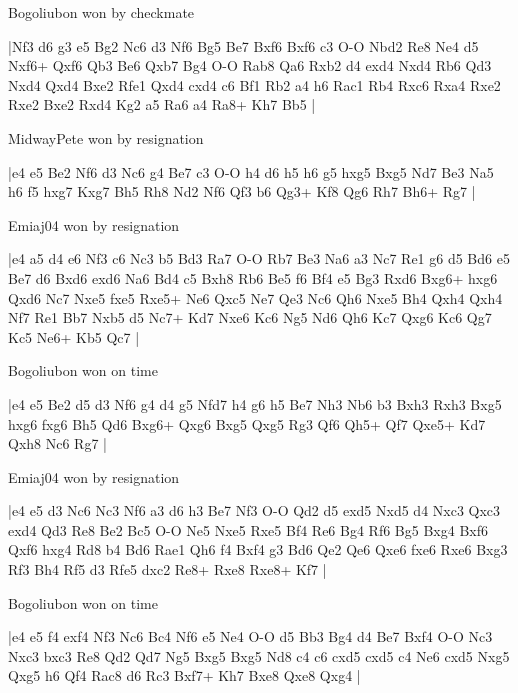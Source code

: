 \showboard

Bogoliubon won by checkmate

\makegametitle
|Nf3 d6 g3 e5 Bg2 Nc6 d3 Nf6 Bg5 Be7 Bxf6 Bxf6 c3 O-O Nbd2 Re8 Ne4 d5 Nxf6+ Qxf6 Qb3 Be6 Qxb7 Bg4 O-O Rab8 Qa6 Rxb2 d4 exd4 Nxd4 Rb6 Qd3 Nxd4 Qxd4 Bxe2 Rfe1 Qxd4 cxd4 c6 Bf1 Rb2 a4 h6 Rac1 Rb4 Rxc6 Rxa4 Rxe2 Rxe2 Bxe2 Rxd4 Kg2 a5 Ra6 a4 Ra8+ Kh7 Bb5  |

\showboard

MidwayPete won by resignation

\makegametitle
|e4 e5 Be2 Nf6 d3 Nc6 g4 Be7 c3 O-O h4 d6 h5 h6 g5 hxg5 Bxg5 Nd7 Be3 Na5 h6 f5 hxg7 Kxg7 Bh5 Rh8 Nd2 Nf6 Qf3 b6 Qg3+ Kf8 Qg6 Rh7 Bh6+ Rg7  |

\showboard

Emiaj04 won by resignation

\makegametitle
|e4 a5 d4 e6 Nf3 c6 Nc3 b5 Bd3 Ra7 O-O Rb7 Be3 Na6 a3 Nc7 Re1 g6 d5 Bd6 e5 Be7 d6 Bxd6 exd6 Na6 Bd4 c5 Bxh8 Rb6 Be5 f6 Bf4 e5 Bg3 Rxd6 Bxg6+ hxg6 Qxd6 Nc7 Nxe5 fxe5 Rxe5+ Ne6 Qxc5 Ne7 Qe3 Nc6 Qh6 Nxe5 Bh4 Qxh4 Qxh4 Nf7 Re1 Bb7 Nxb5 d5 Nc7+ Kd7 Nxe6 Kc6 Ng5 Nd6 Qh6 Kc7 Qxg6 Kc6 Qg7 Kc5 Ne6+ Kb5 Qc7  |

\showboard

Bogoliubon won on time

\makegametitle
|e4 e5 Be2 d5 d3 Nf6 g4 d4 g5 Nfd7 h4 g6 h5 Be7 Nh3 Nb6 b3 Bxh3 Rxh3 Bxg5 hxg6 fxg6 Bh5 Qd6 Bxg6+ Qxg6 Bxg5 Qxg5 Rg3 Qf6 Qh5+ Qf7 Qxe5+ Kd7 Qxh8 Nc6 Rg7  |

\showboard

Emiaj04 won by resignation

\makegametitle
|e4 e5 d3 Nc6 Nc3 Nf6 a3 d6 h3 Be7 Nf3 O-O Qd2 d5 exd5 Nxd5 d4 Nxc3 Qxc3 exd4 Qd3 Re8 Be2 Bc5 O-O Ne5 Nxe5 Rxe5 Bf4 Re6 Bg4 Rf6 Bg5 Bxg4 Bxf6 Qxf6 hxg4 Rd8 b4 Bd6 Rae1 Qh6 f4 Bxf4 g3 Bd6 Qe2 Qe6 Qxe6 fxe6 Rxe6 Bxg3 Rf3 Bh4 Rf5 d3 Rfe5 dxc2 Re8+ Rxe8 Rxe8+ Kf7  |

\showboard

Bogoliubon won on time

\makegametitle
|e4 e5 f4 exf4 Nf3 Nc6 Bc4 Nf6 e5 Ne4 O-O d5 Bb3 Bg4 d4 Be7 Bxf4 O-O Nc3 Nxc3 bxc3 Re8 Qd2 Qd7 Ng5 Bxg5 Bxg5 Nd8 c4 c6 cxd5 cxd5 c4 Ne6 cxd5 Nxg5 Qxg5 h6 Qf4 Rac8 d6 Rc3 Bxf7+ Kh7 Bxe8 Qxe8 Qxg4  |


